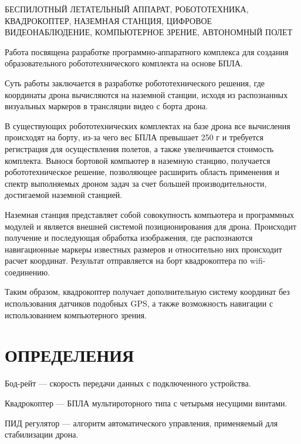 \documentclass[a4paper,12pt]{article}
\begin{document}
БЕСПИЛОТНЫЙ ЛЕТАТЕЛЬНЫЙ АППАРАТ, РОБОТОТЕХНИКА, КВАДРОКОПТЕР, НАЗЕМНАЯ СТАНЦИЯ, ЦИФРОВОЕ ВИДЕОНАБЛЮДЕНИЕ, КОМПЬЮТЕРНОЕ ЗРЕНИЕ, АВТОНОМНЫЙ ПОЛЕТ

Работа посвящена разработке программно-аппаратного комплекса для создания образовательного робототехнического комплекта на основе БПЛА.

Суть работы заключается в разработке робототехнического решения, где координаты дрона вычисляются на наземной станции, исходя из распознанных визуальных маркеров в трансляции видео с борта дрона.

В существующих робототехнических комплектах на базе дрона все вычисления происходят на борту, из-за чего вес БПЛА превышает 250 г и требуется регистрация для осуществления полетов, а также увеличивается стоимость комплекта. Вынося бортовой компьютер в наземную станцию, получается робототехническое решение, позволяющее расширить область применения и спектр выполняемых дроном задач за счет большей производительности, достигаемой наземной станцией. 

Наземная станция представляет собой совокупность компьютера и программных модулей и является внешней системой позиционирования для дрона. Происходит получение и последующая обработка изображения, где распознаются навигационные маркеры известных размеров и относительно них происходит расчет координат. Результат отправляется на борт квадрокоптера по wifi-соединению.
 
Таким образом, квадрокоптер получает дополнительную систему координат без использования датчиков подобных GPS, а также возможность навигации с использованием компьютерного зрения.

\pagebreak
\thispagestyle{empty}

\section*{\centering ОПРЕДЕЛЕНИЯ}

\thispagestyle{empty} %

Бод-рейт --- скорость передачи данных с подключенного устройства.

Квадрокоптер --- БПЛА мультироторного типа с четырьмя несущими винтами.

ПИД регулятор --- алгоритм автоматического управления, применяемый для стабилизации дрона.
\end{document}
